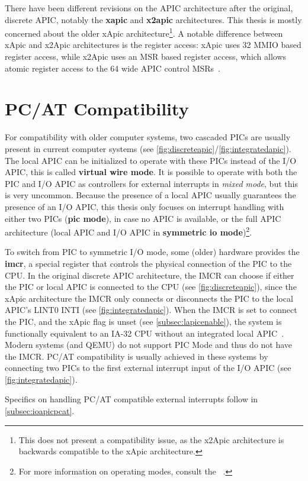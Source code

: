 There have been different revisions on the APIC architecture after the original, discrete APIC, notably the \textbf{\gls{xapic}} and \textbf{\gls{x2apic}} architectures.
This thesis is mostly concerned about the older xApic architecture\footnote{
  This does not present a compatibility issue, as the x2Apic architecture is backwards compatible to the xApic architecture.}.
A notable difference between xApic and x2Apic architectures is the register access: xApic uses \SI{32}{\bit} MMIO based register access, while x2Apic uses an MSR based register access, which allows atomic register access to the \SI{64}{\bit} wide APIC control MSRs~\autocite[sec.~3.11.12]{ia32}.

\section{PC/AT Compatibility}
\label{sec:pcatcompat}

For compatibility with older computer systems, two cascaded PICs are usually present in current computer systems (see \autoref{fig:discreteapic}/\autoref{fig:integratedapic}).
The local APIC can be initialized to operate with these PICs instead of the I/O APIC, this is called \textbf{\gls{virtual wire mode}}.
It is possible to operate with both the PIC and I/O APIC as controllers for external interrupts in \textit{mixed mode}, but this is very uncommon.
Because the presence of a local APIC usually guarantees the presence of an I/O APIC, this thesis only focuses on interrupt handling with either two PICs (\textbf{\gls{pic mode}}), in case no APIC is available, or the full APIC architecture (local APIC and I/O APIC in \textbf{\gls{symmetric io mode}})\footnote{
  For more information on operating modes, consult the ~\autocite[sec.~3.6.2.1]{mpspec}.}.

To switch from PIC to symmetric I/O mode, some (older) hardware provides the \textbf{\gls{imcr}}, a special register that controls the physical connection of the PIC to the CPU\@.
In the original discrete APIC architecture, the IMCR can choose if either the PIC or local APIC is connected to the CPU (see \autoref{fig:discreteapic}), since the xApic architecture the IMCR only connects or disconnects the PIC to the local APIC's LINT0 INTI (see \autoref{fig:integratedapic}).
When the IMCR is set to connect the PIC, and the xApic  flag is unset (see \autoref{subsec:lapicenable}), the system is functionally equivalent to an IA-32 CPU without an integrated local APIC~\autocite[sec.~3.11.4.3]{ia32}.
Modern systems (and QEMU) do not support PIC Mode and thus do not have the IMCR\@.
PC/AT compatibility is usually achieved in these systems by connecting two PICs to the first external interrupt input of the I/O APIC (see \autoref{fig:integratedapic}).

Specifics on handling PC/AT compatible external interrupts follow in \autoref{subsec:ioapicpcat}.

\cleardoublepage